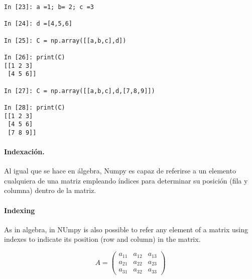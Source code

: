 \begin{center}
    \begin{minipage}{0.4\textwidth}
        \begin{verbatim}
In [23]: a =1; b= 2; c =3

In [24]: d =[4,5,6]

In [25]: C = np.array([[a,b,c],d])

In [26]: print(C)
[[1 2 3]
 [4 5 6]]

In [27]: C = np.array([[a,b,c],d,[7,8,9]])

In [28]: print(C)
[[1 2 3]
 [4 5 6]
 [7 8 9]]
        \end{verbatim}
    \end{minipage}
\end{center}
\begin{paracol}{2}
\paragraph*{Indexación.} Al igual que se hace en álgebra, Numpy es capaz de referirse a un elemento cualquiera de una matriz empleando índices para determinar su posición (fila y columna) dentro de la matriz.
\switchcolumn
\paragraph{Indexing} As in algebra, in NUmpy is also possible to refer any element of a matrix using indexes to indicate its position (row and column) in the matrix. 
\end{paracol}
\begin{equation*}
A=
\begin{pmatrix}
a_{11}&a_{12}&a_{13}\\
a_{21}&a_{22}&a_{23}\\
a_{31}&a_{32}&a_{33}
\end{pmatrix}
\end{equation*}


